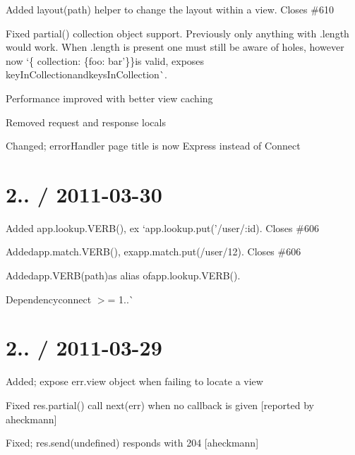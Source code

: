 {\ttfamily 
\begin{DoxyItemize}
\item Added {\ttfamily layout(path)} helper to change the layout within a view. Closes \#610
\item Fixed {\ttfamily partial()} collection object support. Previously only anything with {\ttfamily .length} would work. When {\ttfamily .length} is present one must still be aware of holes, however now `\{ collection\+: \{foo\+: \textquotesingle{}bar'\}\}{\ttfamily is valid, exposes }key\+In\+Collection{\ttfamily and}keys\+In\+Collection\`{}.
\item Performance improved with better view caching
\item Removed {\ttfamily request} and {\ttfamily response} locals
\item Changed; error\+Handler page title is now {\ttfamily Express} instead of {\ttfamily Connect}
\end{DoxyItemize}}

{\ttfamily \section*{2.. / 2011-\/03-\/30 }}

{\ttfamily }

{\ttfamily 
\begin{DoxyItemize}
\item Added {\ttfamily app.\+lookup.\+V\+E\+R\+B()}, ex `app.\+lookup.\+put('/user/\+:id\textquotesingle{}){\ttfamily . Closes \#606}
\item {\ttfamily Added}app.\+match.\+V\+E\+R\+B(){\ttfamily , ex}app.\+match.\+put(\textquotesingle{}/user/12\textquotesingle{}){\ttfamily . Closes \#606}
\item {\ttfamily Added}app.\+V\+E\+R\+B(path){\ttfamily as alias of}app.\+lookup.\+V\+E\+R\+B(){\ttfamily .}
\item {\ttfamily Dependency}connect $>$= 1..\`{}
\end{DoxyItemize}}

{\ttfamily \section*{2.. / 2011-\/03-\/29 }}

{\ttfamily }

{\ttfamily 
\begin{DoxyItemize}
\item Added; expose {\ttfamily err.\+view} object when failing to locate a view
\item Fixed {\ttfamily res.\+partial()} call {\ttfamily next(err)} when no callback is given \mbox{[}reported by aheckmann\mbox{]}
\item Fixed; {\ttfamily res.\+send(undefined)} responds with 204 \mbox{[}aheckmann\mbox{]}
\end{DoxyItemize}}

